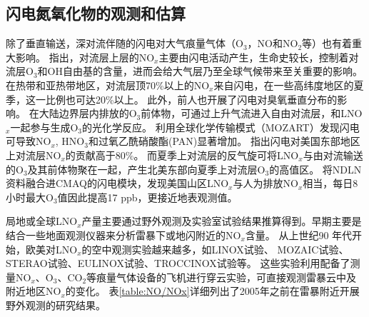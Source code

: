 \subsection{闪电氮氧化物的观测和估算}

除了垂直输送，深对流伴随的闪电对大气痕量气体（O$_3$，NO和NO$_2$等）也有着重大影响\citep{DeCaria.2005,Schumann.2007,Ott.2010,Banerjee.2014}。
\citet{Levy.1996}指出，对流层上层的NO$_x$主要由闪电活动产生，生命史较长，控制着对流层O$_3$和OH自由基的含量，进而会给大气层乃至全球气候带来至关重要的影响。在热带和亚热带地区，对流层顶70\%以上的NO$_x$来自闪电，在一些高纬度地区的夏季，这一比例也可达20\%以上\citep{Jourdain.2001,Martin.2002}。
此外，前人也开展了闪电对臭氧垂直分布的影响。
在大陆边界层内排放的O$_3$前体物，可通过上升气流进入自由对流层，和LNO$_x$一起参与生成O$_3$的光化学反应\citep{Bond.2002}。
\citet{Tie.2001}利用全球化学传输模式（MOZART）发现闪电可导致NO$_x$, HNO$_3$和过氧乙酰硝酸酯(PAN)显著增加。
\citet{Cooper.2009}指出闪电对美国东部地区上对流层NO$_x$的贡献高于80\%。
而夏季上对流层的反气旋可将LNO$_x$与由对流输送的O$_3$及其前体物聚在一起，产生北美东部向夏季上对流层O$_3$的高值区。
\citet{Kang.2020}将NDLN资料融合进CMAQ的闪电模块，发现美国山区LNO$_x$与人为排放NO$_x$相当，每日8小时最大O$_3$值因此提高17 ppb，更接近地表观测值。

局地或全球LNO$_x$产量主要通过野外观测及实验室试验结果推算得到。早期主要是结合一些地面观测仪器来分析雷暴下或地闪附近的NO$_x$含量。
从上世纪90 年代开始，欧美对LNO$_x$的空中观测实验越来越多，如LINOX试验\citep{Huntrieser.1998}、 MOZAIC试验\citep{Marenco.1998}、
STERAO试验\citep{Dye.2000}、EULINOX试验\citep{Holler.2000}、TROCCINOX试验\citep{Huntrieser.2007}等。
这些实验利用配备了测量NO$_x$、O$_3$、CO$_2$等痕量气体设备的飞机进行穿云实验，可直接观测雷暴云中及附近地区NO$_x$的变化。
表\ref{table:NO/NOx}详细列出了2005年之前在雷暴附近开展野外观测的研究结果。

